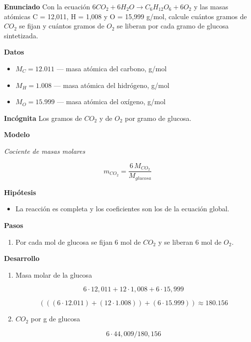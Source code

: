 \documentclass{book}
\begin{document}
\begin{tcolorbox}[title={Problema resuelto}, studiumworked, breakable]

\noindent\textbf{Enunciado}
Con la ecuación \(6 CO_{2} + 6 H_{2}O \to C_{6}H_{12}O_{6} + 6 O_{2}\) y las masas atómicas C = 12,011, H = 1,008 y O = 15,999 g/mol, calcule cuántos gramos de \(CO_{2}\) se fijan y cuántos gramos de \(O_{2}\) se liberan por cada gramo de glucosa sintetizada.


\noindent\textbf{Datos}
\begin{itemize}
\item $M_{C} = 12.011$ — masa atómica del carbono, g/mol
\item $M_{H} = 1.008$ — masa atómica del hidrógeno, g/mol
\item $M_{O} = 15.999$ — masa atómica del oxígeno, g/mol
\end{itemize}

\noindent\textbf{Incógnita}
Los gramos de \(CO_{2}\) y de \(O_{2}\) por gramo de glucosa.


\noindent\textbf{Modelo}

\noindent\textit{Cociente de masas molares}

\[
m_{CO_2} = \frac{6\,M_{CO_2}}{M_{glucosa}}
\]

\noindent\textbf{Hipótesis}
\begin{itemize}
\item La reacción es completa y los coeficientes son los de la ecuación global.
\end{itemize}

\noindent\textbf{Pasos}
\begin{enumerate}
\item
Por cada mol de glucosa se fijan 6 mol de \(CO_{2}\) y se liberan 6 mol de \(O_{2}\).

\end{enumerate}

\noindent\textbf{Desarrollo}
\begin{enumerate}
\item
Masa molar de la glucosa


\[
6\cdot12,011 + 12\cdot1,008 + 6\cdot15,999
\]

\[
\left(\left(\left(6\cdot 12.011\right)+\left(12\cdot 1.008\right)\right)+\left(6\cdot 15.999\right)\right) \approx 180.156
\]
\item
\(CO_{2}\) por g de glucosa


\[
6\cdot44,009/180,156
\]


\end{enumerate}
\end{tcolorbox}
\end{document}
